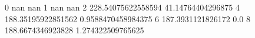 0 nan nan
1 nan nan
2 228.54075622558594 41.14764404296875
4 188.35195922851562 0.9588470458984375
6 187.3931121826172 0.0
8 188.6674346923828 1.274322509765625
